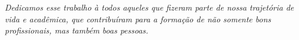 \begin{dedicatoria}
   \vspace*{\fill}
   \centering
   \noindent
   \textit{Dedicamos esse trabalho à todos aqueles que fizeram parte de nossa trajetória de vida e acadêmica, que contribuíram para a formação de não somente bons profissionais, mas também boas pessoas.} 

   
   \vspace*{\fill}
   

\end{dedicatoria}
